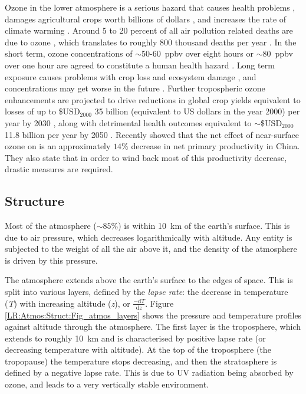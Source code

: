   Ozone in the lower atmosphere is a serious hazard that causes health problems \parencite{Hsieh2013}, damages agricultural crops worth billions of dollars \parencite{Avnery2011,Yue2017}, and increases the rate of climate warming \parencite{IPCC_2013_chap8}.
  Around 5 to 20 percent of all air pollution related deaths are due to ozone \parencite{Monks2015}, which translates to roughly 800 thousand deaths per year \parencite{Lelieveld2013}.
  In the short term, ozone concentrations of $\sim$50-60~ppbv over eight hours or $\sim$80~ppbv over one hour are agreed to constitute a human health hazard \parencite{Ayers2006,Lelieveld2009}. 
  Long term exposure causes problems with crop loss and ecosystem damage \parencite{Emberson2003}, and concentrations may get worse in the future \parencite{Lelieveld2009, Stevenson2013}.
  Further tropospheric ozone enhancements are projected to drive reductions in global crop yields equivalent to losses of up to \$USD$_{2000}$ 35 billion (equivalent to US dollars in the year 2000) per year by 2030 \parencite{Avnery2011}, along with detrimental health outcomes equivalent to $\sim$\$USD$_{2000}$11.8 billion per year by 2050 \parencite{Selin2009}.
  Recently \textcite{Yue2017} showed that the net effect of near-surface ozone on is an approximately $14\%$ decrease in net primary productivity in China.
  They also state that in order to wind back most of this productivity decrease, drastic measures are required. %
  
  
  \subsection{Structure}
  \label{LR:Atmos:Struct}
    
    Most of the atmosphere ($\sim 85\%$) is within 10~km of the earth's surface.
    This is due to air pressure, which decreases logarithmically with altitude.
    Any entity is subjected to the weight of all the air above it, and the density of the atmosphere is driven by this pressure.
    
    The atmosphere extends above the earth's surface to the edges of space. 
    This is split into various layers, defined by the \textit{lapse rate}: the decrease in temperature (\textit{T}) with increasing altitude (\textit{z}), or $\frac{-\textrm{d}T}{\textrm{d}z}$.
    Figure \ref{LR:Atmos:Struct:Fig_atmos_layers} shows the pressure and temperature profiles against altitude through the atmosphere.
    The first layer is the troposphere, which extends to roughly 10~km and is characterised by positive lapse rate (or decreasing temperature with altitude).
    At the top of the troposphere (the tropopause) the temperature stops decreasing, and then the stratosphere is defined by a negative lapse rate.
    This is due to UV radiation being absorbed by ozone, and leads to a very vertically stable environment.
    
